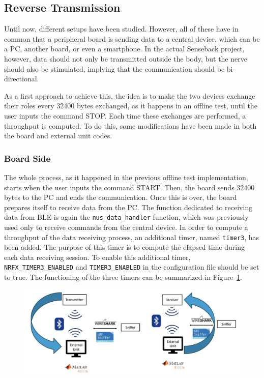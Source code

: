 \documentclass{Configuration_Files/PoliMi3i_thesis}
\begin{document}
\subsection{Reverse Transmission}

Until now, different setups have been studied. However, all of these have in common that a peripheral board is sending data to a central device, which can be a PC, another board, or even a smartphone. In the actual Senseback project, however, data should not only be transmitted outside the body, but the nerve should also be stimulated, implying that the communication should be bi-directional.

As a first approach to achieve this, the idea is to make the two devices exchange their roles every 32400 bytes exchanged, as it happens in an offline test, until the user inputs the command STOP. Each time these exchanges are performed, a throughput is computed. To do this, some modifications have been made in both the board and external unit codes.

\subsubsection{Board Side}

The whole process, as it happened in the previous offline test implementation, starts when the user inputs the command START. Then, the board sends 32400 bytes to the PC and ends the communication. Once this is over, the board prepares itself to receive data from the PC. The function dedicated to receiving data from BLE is again the \texttt{nus\_data\_handler} function, which was previously used only to receive commands from the central device. In order to compute a throughput of the data receiving process, an additional timer, named \texttt{timer3}, has been added. The purpose of this timer is to compute the elapsed time during each data receiving session. To enable this additional timer, \texttt{NRFX\_TIMER3\_ENABLED} and \texttt{TIMER3\_ENABLED} in the configuration file should be set to true. The functioning of the three timers can be summarized in Figure~\ref{fig:timers}.

\begin{figure}[H]
\centering
\includegraphics[scale=0.7]{Board_Windows_PC/9.png}
\label{fig:timers}
\end{figure}
\end{document}
